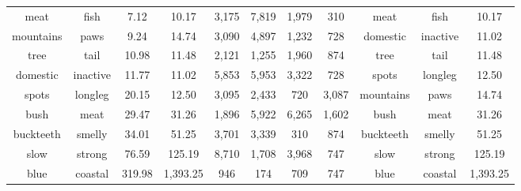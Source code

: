 \begin{table}[t!]
{\begin{tabular}{|cc|cc|cc|cc||ccc|}
meat      & fish      & 7.12   &  10.17  & 3,175  & 7,819  & 1,979 & 310   & meat        & fish      &  10.17 \\ 
mountains & paws      & 9.24   &  14.74  & 3,090  & 4,897  & 1,232 & 728   & domestic    & inactive  &  11.02 \\ 
tree      & tail      & 10.98  &  11.48  & 2,121  & 1,255  & 1,960 & 874   & tree        & tail      &  11.48 \\ 
domestic  & inactive  & 11.77  &  11.02  & 5,853  & 5,953  & 3,322 & 728   & spots       & longleg   &  12.50 \\ 
spots     & longleg   & 20.15  &  12.50  & 3,095  & 2,433  & 720   & 3,087 & mountains   & paws      &  14.74 \\ 
bush      & meat      & 29.47  &  31.26  & 1,896  & 5,922  & 6,265 & 1,602 & bush        & meat      &  31.26 \\ 
buckteeth & smelly    & 34.01  &  51.25  & 3,701  & 3,339  & 310   & 874   & buckteeth   & smelly    &  51.25 \\ 
slow      & strong    & 76.59  &  125.19 & 8,710  & 1,708  & 3,968 & 747   & slow        & strong    & 125.19 \\ 
blue      & coastal   & 319.98 &1,393.25 & 946    & 174    & 709  & 747    & blue        & coastal   & 1,393.25 \\ 
\hline
\end{tabular}
}
\end{table}

